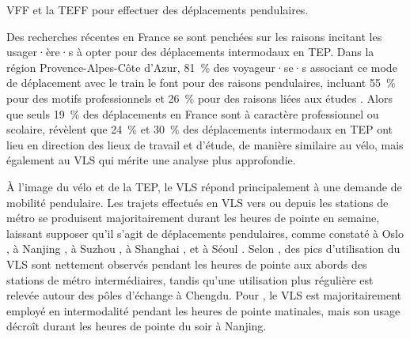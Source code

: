 \begin{refsegment}
\acrshort{VFF} et la \acrshort{TEFF} pour effectuer des déplacements pendulaires.%

Des recherches récentes en France se sont penchées sur les raisons incitant les usager·ère·s à opter pour des déplacements intermodaux en \acrshort{TEP}. Dans la région Provence-Alpes-Côte d'Azur, 81~\% des voyageur·se·s associant ce mode de déplacement avec le train le font pour des raisons pendulaires, incluant 55~\% pour des motifs professionnels et 26~\% pour des raisons liées aux études \textcolor{blue}{\autocite[184]{moinse_intermodal_2022}}. Alors que seuls 19~\% des déplacements en France sont à caractère professionnel ou scolaire, \textcolor{blue}{\textcite[62]{rabaud_quand_2022}} révèlent que 24~\% et 30~\% des déplacements intermodaux en \acrshort{TEP} ont lieu en direction des lieux de travail et d'étude, de manière similaire au vélo, mais également au \acrshort{VLS} qui mérite une analyse plus approfondie.%

À l'image du vélo et de la \acrshort{TEP}, le \acrshort{VLS} répond principalement à une demande de mobilité pendulaire. Les trajets effectués en \acrshort{VLS} vers ou depuis les stations de métro se produisent majoritairement durant les heures de pointe en semaine, laissant supposer qu'il s'agit de déplacements pendulaires, comme constaté à Oslo \textcolor{blue}{\autocite[394]{bocker_bike_2020}}, à Nanjing \textcolor{blue}{\autocite[68]{ma_understanding_2018}}, à Suzhou \textcolor{blue}{\autocite[10]{gu_measuring_2019}}, à Shanghai \textcolor{blue}{\autocite[8]{yu_policy_2021}}, et à Séoul \textcolor{blue}{\autocite[8]{kim_analysis_2021}}. Selon \textcolor{blue}{\textcite[890]{bi_analysis_2021}}, des pics d'utilisation du \acrshort{VLS} sont nettement observés pendant les heures de pointe aux abords des stations de métro intermédiaires, tandis qu'une utilisation plus régulière est relevée autour des pôles d'échange à Chengdu. Pour \textcolor{blue}{\textcite[128]{liu_understanding_2020}}, le \acrshort{VLS} est majoritairement employé en intermodalité pendant les heures de pointe matinales, mais son usage décroît durant les heures de pointe du soir à Nanjing.%


\end{refsegment}
